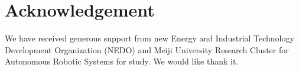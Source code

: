 \documentclass[a4paper, 10pt, conference]{ieeeconf}      %
\begin{document}











\section{Acknowledgement}
We have received generous support from new Energy and Industrial Technology Development Organization (NEDO) and Meiji University Research Cluster for Autonomous Robotic Systems for study. We would like thank it.

\addtolength{\textheight}{-12cm}   %










\newpage
\end{document}
